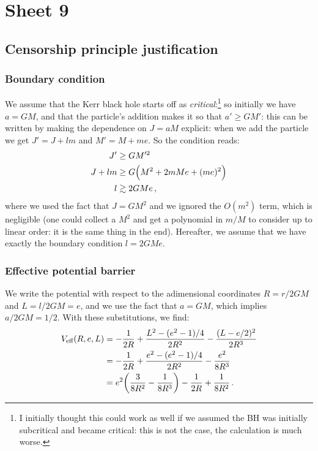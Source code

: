 \documentclass[main.tex]{subfiles}
\begin{document}
\section{Sheet 9}

\subsection{Censorship principle justification}

\subsubsection{Boundary condition}

We assume that the Kerr black hole starts off as \emph{critical}:\footnote{I initially thought this could work as well if we assumed the BH was initially subcritical and became critical: this is not the case, the calculation is much worse.} so initially we have \(a = GM\), and that the particle's addition makes it so that \(a' \geq G M'\): this can be written by making the dependence on \(J = aM\) explicit: when we add the particle we get \(J'= J + lm\) and \(M' = M + me\). So the condition reads: 
%
\begin{subequations}
\begin{align}
  J' &\geq G M^{\prime 2}  \\
  J + lm &\geq G \qty(M^2 + 2mMe + (me)^2)  \\
  l &\gtrsim 2GM e
  \,,
\end{align}
\end{subequations}
%
where we used the fact that \(J = G M^2\) and we ignored the \(O(m^2)\) term, which is negligible (one could collect a \(M^2\) and get a polynomial in \(m/M\) to consider up to linear order: it is the same thing in the end).
Hereafter, we assume that we have exactly the boundary condition \(l = 2GMe\). 

\subsubsection{Effective potential barrier}

We write the potential with respect to the adimensional coordinates \(R = r/2GM\) and \(L= l/2GM = e\), and we  use the fact that \(a = GM\), which implies \(a/2GM = 1/2\). With these substitutions, we find: 
%
\begin{subequations}
\begin{align}
  V _{\text{eff}} (R, e, L) &= 
  - \frac{1}{2R} 
  + \frac{L^2 -  (e^2 - 1) / 4 }{2R^2}
  - \frac{(L - e/2)^2}{2R^3}  \\
  &=   - \frac{1}{2R} 
  + \frac{e^2 -  (e^2 - 1) / 4 }{2R^2}
  - \frac{e^2}{8R^3}  \\
  &= e^2 \qty(\frac{3}{8R^2} - \frac{1}{8R^3}) - \frac{1}{2R} + \frac{1}{8R^2}
\,.
\end{align}
\end{subequations}
\end{document}
